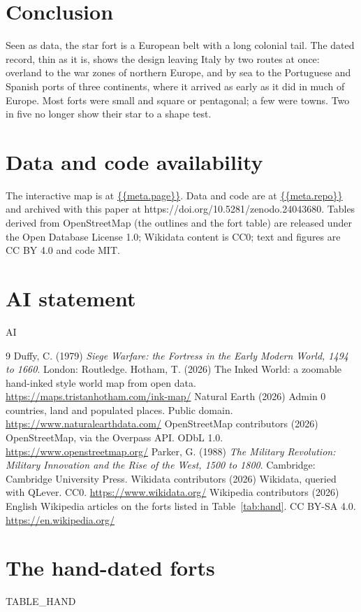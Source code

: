 \documentclass[11pt,a4paper]{article}
\begin{document}
\section{Conclusion}
Seen as data, the star fort is a European belt with a long colonial tail. The dated record, thin as it is, shows the design leaving Italy by two routes at once: overland to the war zones of northern Europe, and by sea to the Portuguese and Spanish ports of three continents, where it arrived as early as it did in much of Europe. Most forts were small and square or pentagonal; a few were towns. Two in five no longer show their star to a shape test.

\section*{Data and code availability}
The interactive map is at \url{{{meta.page}}}. Data and code are at \url{{{meta.repo}}} and archived with this paper at https://doi.org/10.5281/zenodo.24043680. Tables derived from OpenStreetMap (the outlines and the fort table) are released under the Open Database License 1.0; Wikidata content is CC0; text and figures are CC BY 4.0 and code MIT.

\section*{AI statement}
{{AI}}

\begin{thebibliography}{9}
 Duffy, C. (1979) \textit{Siege Warfare: the Fortress in the Early Modern World, 1494 to 1660}. London: Routledge.
 Hotham, T. (2026) The Inked World: a zoomable hand-inked style world map from open data. \url{https://maps.tristanhotham.com/ink-map/}
 Natural Earth (2026) Admin 0 countries, land and populated places. Public domain. \url{https://www.naturalearthdata.com/}
 OpenStreetMap contributors (2026) OpenStreetMap, via the Overpass API. ODbL 1.0. \url{https://www.openstreetmap.org/}
 Parker, G. (1988) \textit{The Military Revolution: Military Innovation and the Rise of the West, 1500 to 1800}. Cambridge: Cambridge University Press.
 Wikidata contributors (2026) Wikidata, queried with QLever. CC0. \url{https://www.wikidata.org/}
 Wikipedia contributors (2026) English Wikipedia articles on the forts listed in Table~\ref{tab:hand}. CC BY-SA 4.0. \url{https://en.wikipedia.org/}
\end{thebibliography}

\clearpage
\appendix
\section{The hand-dated forts}
{{TABLE_HAND}}
\end{document}

